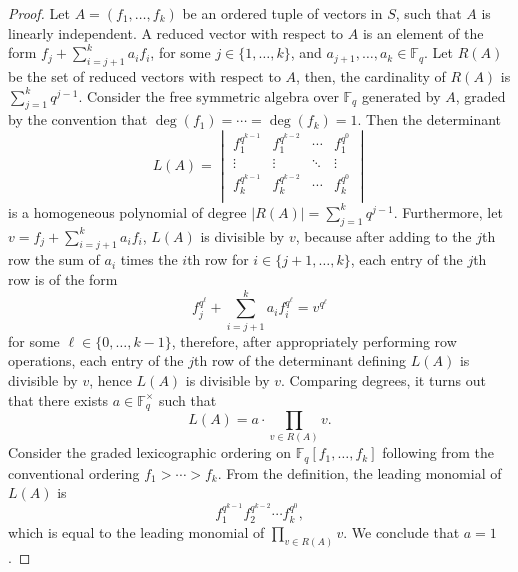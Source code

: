 \documentclass[12pt,a4paper]{report}
\theoremstyle{definition}
\theoremstyle{remark}
\theoremstyle{definition}
\begin{document}
\begin{proof}
    Let $A = (f_1, \ldots, f_k)$ be an ordered tuple of vectors in $S$, such that $A$ is linearly independent. A reduced vector with respect to $A$ is an element of the form $f_j + \sum\limits_{i=j+1}^{k}a_i f_i$, for some $j\in \{1, \ldots, k\}$, and $a_{j+1}, \ldots, a_k\in \mathbb{F}_q$. Let $R(A)$ be the set of reduced vectors with respect to $A$, then, the cardinality of $R(A)$ is $\sum\limits_{j=1}^{k}q^{j-1}$. Consider the free symmetric algebra over $\mathbb{F}_q$ generated by $A$, graded by the convention that $\deg(f_1) =\cdots = \deg(f_k)=1$. Then the determinant
    \begin{equation*}
        L(A) = \begin{vmatrix}
        f_1^{q^{k-1}} & f_1^{q^{k-2}} & \cdots & f_1^{q^0}\\
        \vdots & \vdots & \ddots  & \vdots\\
        f_k^{q^{k-1}} & f_k^{q^{k-2}} & \cdots & f_k^{q^0}\\
        \end{vmatrix}
    \end{equation*}
    is a homogeneous polynomial of degree $|R(A)| = \sum\limits_{j=1}^{k}q^{j-1}$. Furthermore, let $v = f_j + \sum\limits_{i=j+1}^{k}a_i f_i$, $L(A)$ is divisible by $v$, because after adding to the $j$th row the sum of $a_i$ times the $i$th row for $i\in \{j+1, \ldots, k\}$, each entry of the $j$th row is of the form
    \begin{equation*}
        f_j^{q^{\ell}} + \sum\limits_{i=j+1}^{k}a_i f_i^{q^{\ell}} = v^{q^{\ell}} 
    \end{equation*}
    for some $\ell\in \{0, \ldots, k-1\}$, therefore, after appropriately performing row operations, each entry of the $j$th row of the determinant defining $L(A)$ is divisible by $v$, hence $L(A)$ is divisible by $v$. Comparing degrees, it turns out that there exists $a\in \mathbb{F}_q^{\times}$ such that
    \begin{equation*}
        L(A) = a\cdot \prod\limits_{v\in R(A)}v.
    \end{equation*}
    Consider the graded lexicographic ordering on $\mathbb{F}_q[f_1, \ldots, f_k]$ following from the conventional ordering $f_1 >\cdots >f_k$. From the definition, the leading monomial of $L(A)$ is
    \begin{equation*}
        f_1^{q^{k-1}}f_2^{q^{k-2}}\cdots f_k^{q^0},
    \end{equation*}
    which is equal to the leading monomial of $\prod\limits_{v\in R(A)}v$. We conclude that $a=1$. \smallbreak

\end{proof}
\end{document}
